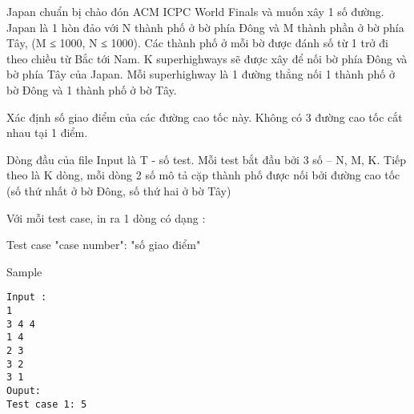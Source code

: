 

Japan chuẩn bị chào đón ACM ICPC World Finals và muốn xây 1 số đường. Japan là 1 hòn đảo với N thành phố ở bờ phía Đông và M thành phần ở bờ phía Tây, (M ≤ 1000, N ≤ 1000). Các thành phố ở mỗi bờ được đánh số từ 1 trở đi theo chiều từ Bắc tới Nam. K superhighways sẽ được xây để nối bờ phía Đông và bờ phía Tây của Japan. Mỗi superhighway là 1 đường thẳng nối 1 thành phố ở bờ Đông và 1 thành phố ở bờ Tây.

Xác định số giao điểm của các đường cao tốc này. Không có 3 đường cao tốc cắt nhau tại 1 điểm.

Dòng đầu của file Input là T - số test. Mỗi test bắt đầu bởi 3 số – N, M, K. Tiếp theo là K dòng, mỗi dòng 2 số mô tả cặp thành phố được nối bởi đường cao tốc (số thứ nhất ở bờ Đông, số thứ hai ở bờ Tây)

Với mỗi test case, in ra 1 dòng có dạng :

Test case "case number": "số giao điểm"

Sample
\begin{verbatim}
Input :
1 
3 4 4 
1 4 
2 3 
3 2 
3 1 
Ouput: 
Test case 1: 5
\end{verbatim}